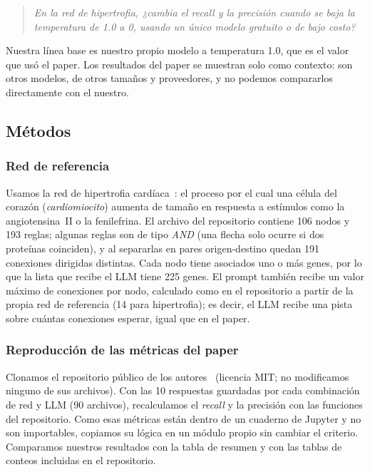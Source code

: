 \documentclass[unnumsec,webpdf,contemporary,large]{oup-authoring-template}
\begin{document}
\begin{quote}
\emph{En la red de hipertrofia, ¿cambia el \emph{recall} y la precisión cuando se baja la temperatura de 1.0 a 0, usando un único modelo gratuito o de bajo costo?}
\end{quote}

Nuestra línea base es nuestro propio modelo a temperatura 1.0, que es el valor que usó el paper. Los resultados del paper se muestran solo como contexto: son otros modelos, de otros tamaños y proveedores, y no podemos compararlos directamente con el nuestro.

\subsection{Métodos}\label{sec:A:metodos}

\subsubsection{Red de referencia}

Usamos la red de hipertrofia cardíaca~\cite{ryall2012}: el proceso por el cual una célula del corazón (\emph{cardiomiocito}) aumenta de tamaño en respuesta a estímulos como la angiotensina~II o la fenilefrina. El archivo del repositorio contiene 106 nodos y 193 reglas; algunas reglas son de tipo \emph{AND} (una flecha solo ocurre si dos proteínas coinciden), y al separarlas en pares origen-destino quedan 191 conexiones dirigidas distintas. Cada nodo tiene asociados uno o más genes, por lo que la lista que recibe el LLM tiene 225 genes. El prompt también recibe un valor máximo de conexiones por nodo, calculado como en el repositorio a partir de la propia red de referencia (14 para hipertrofia); es decir, el LLM recibe una pista sobre cuántas conexiones esperar, igual que en el paper.

\subsubsection{Reproducción de las métricas del paper}

Clonamos el repositorio público de los autores~\cite{repo_saucerman} (licencia MIT; no modificamos ninguno de sus archivos). Con las 10 respuestas guardadas por cada combinación de red y LLM (90 archivos), recalculamos el \emph{recall} y la precisión con las funciones del repositorio. Como esas métricas están dentro de un cuaderno de Jupyter y no son importables, copiamos su lógica en un módulo propio sin cambiar el criterio. Comparamos nuestros resultados con la tabla de resumen y con las tablas de conteos incluidas en el repositorio.
\end{document}
